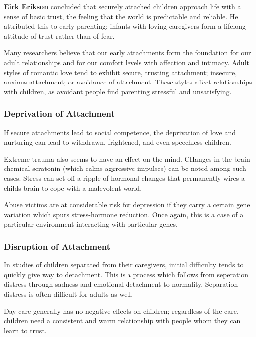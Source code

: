 \documentclass[12pt]{article}
\begin{document}
{\bf Eirk Erikson} concluded that securely attached children approach life with a sense of basic trust, the feeling that the world is predictable and reliable. He attributed this to early parenting: infants with loving caregivers form a lifelong attitude of trust rather than of fear.

Many researchers believe that our early attachments form the foundation for our adult relationships and for our comfort levels with affection and intimacy. Adult styles of romantic love tend to exhibit secure, trusting attachment; insecure, anxious attachment; or avoidance of attachment. These styles affect relationships with children, as avoidant people find parenting stressful and unsatisfying.

\subsubsection*{Deprivation of Attachment}
If secure attachments lead to social competence, the deprivation of love and nurturing can lead to withdrawn, frightened, and even speechless children.

Extreme trauma also seems to have an effect on the mind. CHanges in the brain chemical seratonin (which calms aggressive impulses) can be noted among such cases. Stress can set off a ripple of hormonal changes that permanently wires a childs brain to cope with a malevolent world.

Abuse victims are at considerable risk for depression if they carry a certain gene variation which spurs stress-hormone reduction. Once again, this is a case of a particular environment interacting with particular genes.

\subsubsection*{Disruption of Attachment}
In studies of children separated from their caregivers, initial difficulty tends to quickly give way to detachment. This is a process which follows from seperation distress through sadness and emotional detachment to normality. Separation distress is often difficult for adults as well.

Day care generally has no negative effects on children; regardless of the care, children need a consistent and warm relationship with people whom they can learn to trust.
\end{document}
